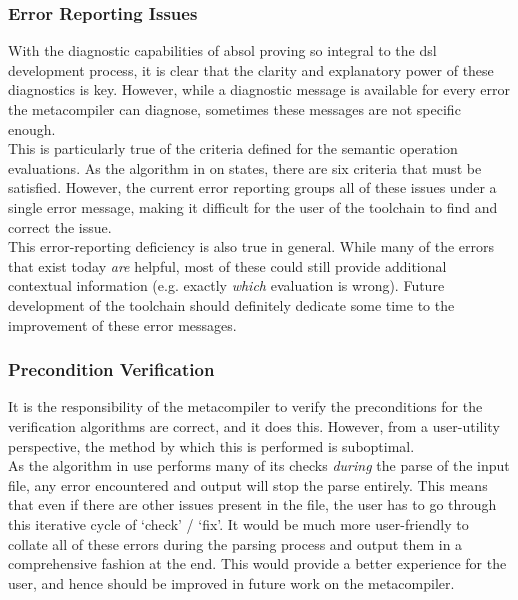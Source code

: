 \subsubsection{Error Reporting Issues} %
\label{ssub:error_reporting_issues}
With the diagnostic capabilities of \gls{absol} proving so integral to the \gls{dsl} development process, it is clear that the clarity and explanatory power of these diagnostics is key.
However, while a diagnostic message is available for every error the metacompiler can diagnose, sometimes these messages are not specific enough.\\

This is particularly true of the criteria defined for the semantic operation evaluations.
As the algorithm in  on  states, there are six criteria that must be satisfied.
However, the current error reporting groups all of these issues under a single error message, making it difficult for the user of the toolchain to find and correct the issue.\\

This error-reporting deficiency is also true in general.
While many of the errors that exist today \textit{are} helpful, most of these could still provide additional contextual information (e.g. exactly \textit{which} evaluation is wrong).
Future development of the toolchain should definitely dedicate some time to the improvement of these error messages.


\subsubsection{Precondition Verification} %
\label{ssub:precondition_verification}
It is the responsibility of the metacompiler to verify the preconditions for the verification algorithms are correct, and it does this.
However, from a user-utility perspective, the method by which this is performed is suboptimal.\\

As the algorithm in use performs many of its checks \textit{during} the parse of the input file, any error encountered and output will stop the parse entirely.
This means that even if there are other issues present in the file, the user has to go through this iterative cycle of `check' / `fix'.
It would be much more user-friendly to collate all of these errors during the parsing process and output them in a comprehensive fashion at the end.
This would provide a better experience for the user, and hence should be improved in future work on the metacompiler. 

